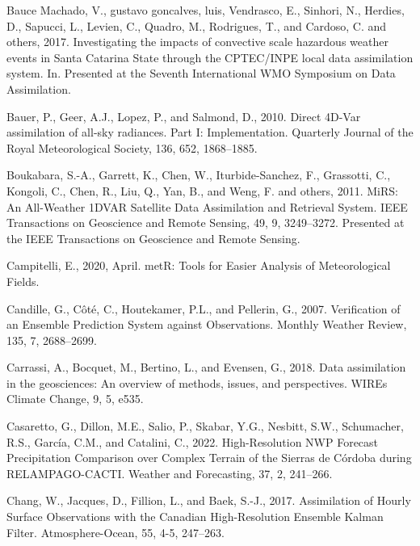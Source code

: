 \documentclass[12pt,oneside]{reedthesis}
\begin{document}
\leavevmode\hypertarget{ref-baucemachado2017}{}%
Bauce Machado, V., gustavo goncalves, luis, Vendrasco, E., Sinhori, N., Herdies, D., Sapucci, L., Levien, C., Quadro, M., Rodrigues, T., and Cardoso, C. and others, 2017. Investigating the impacts of convective scale hazardous weather events in Santa Catarina State through the CPTEC/INPE local data assimilation system. In. Presented at the Seventh International WMO Symposium on Data Assimilation.

\leavevmode\hypertarget{ref-bauer2010}{}%
Bauer, P., Geer, A.J., Lopez, P., and Salmond, D., 2010. Direct 4D-Var assimilation of all-sky radiances. Part I: Implementation. Quarterly Journal of the Royal Meteorological Society, 136, 652, 1868--1885.

\leavevmode\hypertarget{ref-boukabara2011}{}%
Boukabara, S.-A., Garrett, K., Chen, W., Iturbide-Sanchez, F., Grassotti, C., Kongoli, C., Chen, R., Liu, Q., Yan, B., and Weng, F. and others, 2011. MiRS: An All-Weather 1DVAR Satellite Data Assimilation and Retrieval System. IEEE Transactions on Geoscience and Remote Sensing, 49, 9, 3249--3272. Presented at the IEEE Transactions on Geoscience and Remote Sensing.

\leavevmode\hypertarget{ref-campitelli2020}{}%
Campitelli, E., 2020, April. metR: Tools for Easier Analysis of Meteorological Fields.

\leavevmode\hypertarget{ref-candille2007}{}%
Candille, G., Côté, C., Houtekamer, P.L., and Pellerin, G., 2007. Verification of an Ensemble Prediction System against Observations. Monthly Weather Review, 135, 7, 2688--2699.

\leavevmode\hypertarget{ref-carrassi2018}{}%
Carrassi, A., Bocquet, M., Bertino, L., and Evensen, G., 2018. Data assimilation in the geosciences: An overview of methods, issues, and perspectives. WIREs Climate Change, 9, 5, e535.

\leavevmode\hypertarget{ref-casaretto2022}{}%
Casaretto, G., Dillon, M.E., Salio, P., Skabar, Y.G., Nesbitt, S.W., Schumacher, R.S., García, C.M., and Catalini, C., 2022. High-Resolution NWP Forecast Precipitation Comparison over Complex Terrain of the Sierras de Córdoba during RELAMPAGO-CACTI. Weather and Forecasting, 37, 2, 241--266.

\leavevmode\hypertarget{ref-chang2017}{}%
Chang, W., Jacques, D., Fillion, L., and Baek, S.-J., 2017. Assimilation of Hourly Surface Observations with the Canadian High-Resolution Ensemble Kalman Filter. Atmosphere-Ocean, 55, 4-5, 247--263.
\end{document}
